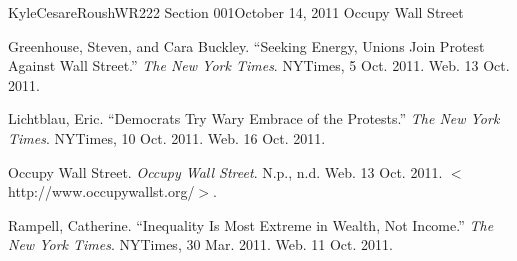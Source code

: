 \documentclass[12pt,letterpaper]{article}
\begin{document}
\begin{mla}{Kyle}{Cesare}{Roush}{WR222 Section 001}{October 14, 2011}{
Occupy Wall Street}
\begin{workscited}
\bibent Greenhouse, Steven, and Cara Buckley. ``Seeking Energy, Unions Join
Protest Against Wall Street.'' \emph{The New York Times}. NYTimes, 5 Oct. 2011.
Web. 13 Oct. 2011.

\bibent Lichtblau, Eric. ``Democrats Try Wary Embrace of the Protests.''
\emph{The New York Times}. NYTimes, 10 Oct. 2011. Web. 16 Oct. 2011. 

\bibent Occupy Wall Street. \emph{Occupy Wall Street}. N.p., n.d. Web. 13 Oct.
2011.  $<$http://www.occupywallst.org/$>$.

\bibent Rampell, Catherine. ``Inequality Is Most Extreme in Wealth, Not
Income.'' \emph{The New York Times}. NYTimes, 30 Mar. 2011. Web. 11 Oct. 2011. 

\end{workscited}
\end{mla}
\end{document}
